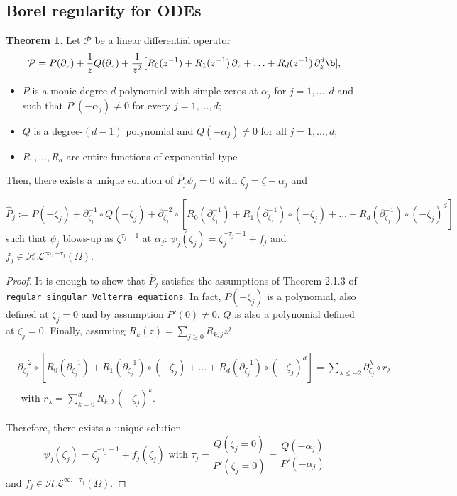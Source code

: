 \documentclass{article}
\theoremstyle{definition}
\newtheorem{theorem}{Theorem}[section]
\begin{document}
\subsection{Borel regularity for ODEs}


\begin{theorem}\label{thm1-dim}
Let $\mathcal{P}$ be a linear differential operator 
\begin{equation}
\mathcal{P} = P(\partial_z) + \frac{1}{z} Q(\partial_z) + \frac{1}{z^2}\big[ R_0(z^{-1}) + R_1(z^{-1})\,\partial_z + \ldots + R_d(z^{-1})\,\partial_z^d \b],
\end{equation}

\begin{itemize}
\item $P$ is a monic degree-$d$ polynomial with simple zeros at $\alpha_j$ for $j=1,...,d$ and such that $P'(-\alpha_j)\neq 0$ for every $j=1,...,d$;
\item $Q$ is a degree-$(d-1)$ polynomial and $Q(-\alpha_j)\neq 0$ for all $j=1,...,d$;
\item $R_0, \ldots, R_d$ are entire functions of exponential type
\end{itemize}

Then, there exists a unique solution of $\hat{P}_j\psi_j=0$ with $\zeta_j=\zeta-\alpha_j$ and

\color{brown}
\begin{equation}
\hat{P}_j:=P(-\zeta_j)+\partial_{\zeta_j}^{-1}\circ Q(-\zeta_j)+\partial_{\zeta_j}^{-2}\circ\left[R_0(\partial_{\zeta_j}^{-1})+R_1(\partial_{\zeta_j}^{-1})\circ (-\zeta_j)+...+R_d(\partial_{\zeta_j}^{-1})\circ (-\zeta_j)^d\right]
\end{equation}
\color{black}
such that $\psi_j$ blows-up as $\zeta^{\tau_j-1}$ at $\alpha_j$:
${\psi}_j(\zeta_j)=\zeta_j^{-\tau_j-1}+f_j$ and $f_j\in\mathcal{HL}^{\infty,-\tau_j}(\Omega)$. 
\end{theorem}
\begin{proof}
It is enough to show that $\hat{P}_j$ satisfies the assumptions of Theorem 2.1.3 of {\tt regular singular Volterra equations}.  In fact, $P(-\zeta_j)$ is a polynomial, also defined at $\zeta_j=0$ and by assumption $P'(0)\neq 0$. $Q$ is also a polynomial defined at $\zeta_j=0$. Finally, assuming $R_k(z)=\sum_{j\geq 0} R_{k,j}z^j$ 

\begin{align*}
&\partial_{\zeta_j}^{-2}\circ\left[R_0(\partial_{\zeta_j}^{-1})+R_1(\partial_{\zeta_j}^{-1})\circ (-\zeta_j)+...+R_d(\partial_{\zeta_j}^{-1})\circ (-\zeta_j)^d\right]=\sum_{\lambda\leq -2} \partial_{\zeta_j}^\lambda\circ r_\lambda \\
&\text{ with }r_\lambda=\sum_{k=0}^d R_{k,\lambda}(-\zeta_j)^k.
\end{align*}


Therefore, there exists a unique solution \[\psi_j(\zeta_j)=\zeta_j^{-\tau_j-1}+f_j(\zeta_j) \text{ with } \tau_j=\frac{Q(\zeta_j=0)}{P'(\zeta_j=0)}=\frac{Q(-\alpha_j)}{P'(-\alpha_j)}\] and $f_j\in\mathcal{HL}^{\infty,-\tau_j}(\Omega)$.  
 
\end{proof}
\end{document}
